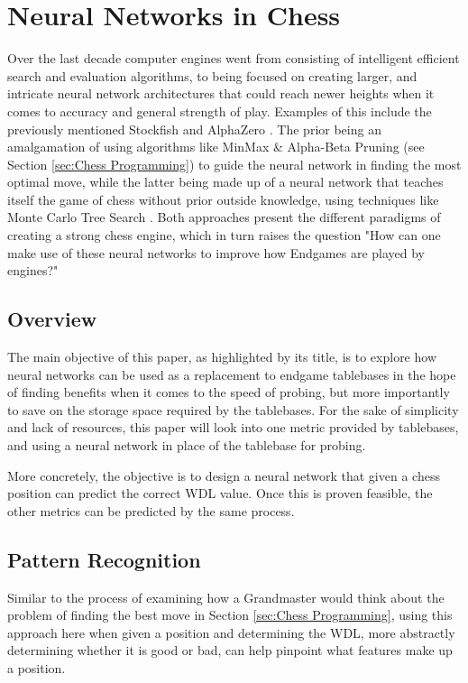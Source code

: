 \section{Neural Networks in Chess}
\label{sec:NeuralNets}

Over the last decade computer engines went from consisting of intelligent efficient search and evaluation algorithms, to being focused on creating larger, and intricate neural network architectures that could reach newer heights when it comes to accuracy and general strength of play. Examples of this include the previously mentioned Stockfish \cite{stockfish2024} and AlphaZero \cite{AlphaZero}. The prior being an amalgamation of using algorithms like MinMax \& Alpha-Beta Pruning (see Section \ref{sec:Chess Programming}) to guide the neural network in finding the most optimal move, while the latter being made up of a neural network that teaches itself the game of chess without prior outside knowledge, using techniques like Monte Carlo Tree Search \cite{Klein}. Both approaches present the different paradigms of creating a strong chess engine, which in turn raises the question "How can one make use of these neural networks to improve how Endgames are played by engines?"

\subsection{Overview}
The main objective of this paper, as highlighted by its title, is to explore how neural networks can be used as a replacement to endgame tablebases in the hope of finding benefits when it comes to the speed of probing, but more importantly to save on the storage space required by the tablebases. For the sake of simplicity and lack of resources, this paper will look into one metric provided by tablebases, and using a neural network in place of the tablebase for probing.

More concretely, the objective is to design a neural network that given a chess position can predict the correct WDL value. Once this is proven feasible, the other metrics can be predicted by the same process. 

\subsection{Pattern Recognition}
\label{subsec:PattRec}
Similar to the process of examining how a Grandmaster would think about the problem of finding the best move in Section \ref{sec:Chess Programming}, using this approach here when given a position and determining the WDL, more abstractly determining whether it is good or bad, can help pinpoint what features make up a position.

